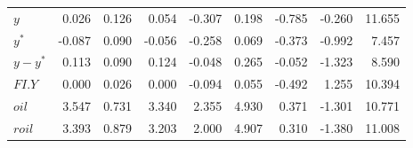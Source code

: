 \documentclass[10pt]{article}
\numberwithin{equation}{section}
\numberwithin{table}{section}
\numberwithin{figure}{section}
\begin{document}
\begin{spacing}{1.5}
\begin{tabularx}{\textwidth}{lrrrrrrrr}
$y$   & 0.026 & 0.126 & 0.054 & -0.307 & 0.198 & -0.785 & -0.260 & 11.655 \\
$y^*$ & -0.087 & 0.090 & -0.056 & -0.258 & 0.069 & -0.373 & -0.992 & 7.457 \\
$y-y^*$ & 0.113 & 0.090 & 0.124 & -0.048 & 0.265 & -0.052 & -1.323 & 8.590 \\
$FI.Y$ & 0.000 & 0.026 & 0.000 & -0.094 & 0.055 & -0.492 & 1.255 & 10.394 \\
$oil$ & 3.547 & 0.731 & 3.340 & 2.355 & 4.930 & 0.371 & -1.301 & 10.771 \\
$roil$ & 3.393 & 0.879 & 3.203 & 2.000 & 4.907 & 0.310 & -1.380 & 11.008 \\
\hline
\end{tabularx}
\vspace*{-0,6cm}\parnotes


\end{spacing}
\end{document}
